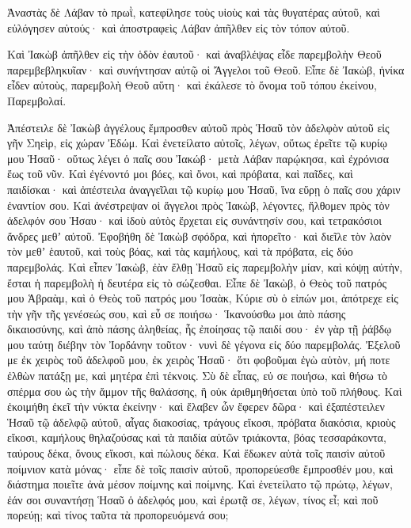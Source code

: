 {Ἀναστὰς δὲ Λάβαν τὸ πρωῒ, κατεφίλησε τοὺς υἱοὺς καὶ τὰς θυγατέρας αὐτοῦ, καὶ εὐλόγησεν αὐτούς· καὶ ἀποστραφεὶς Λάβαν ἀπῆλθεν εἰς τὸν τόπον αὐτοῦ.
\par }{\PP {}Καὶ Ἰακὼβ ἀπῆλθεν εἰς τὴν ὁδὸν ἑαυτοῦ· καὶ ἀναβλέψας εἶδε παρεμβολὴν Θεοῦ παρεμβεβληκυῖαν· καὶ συνήντησαν αὐτῷ οἱ Ἄγγελοι τοῦ Θεοῦ.
Εἶπε δὲ Ἰακὼβ, ἡνίκα εἶδεν αὐτοὺς, παρεμβολὴ Θεοῦ αὕτη· καὶ ἐκάλεσε τὸ ὄνομα τοῦ τόπου ἐκείνου, Παρεμβολαί.
\par }{\PP {}Ἀπέστειλε δὲ Ἰακὼβ ἀγγέλους ἔμπροσθεν αὐτοῦ πρὸς Ἡσαῦ τὸν ἀδελφὸν αὐτοῦ εἰς γῆν Σηεὶρ, εἰς χώραν Ἐδώμ.
Καὶ ἐνετείλατο αὐτοῖς, λέγων, οὕτως ἐρεῖτε τῷ κυρίῳ μου Ἡσαῦ· οὕτως λέγει ὁ παῖς σου Ἰακώβ· μετὰ Λάβαν παρῴκησα, καὶ ἐχρόνισα ἕως τοῦ νῦν.
Καὶ ἐγένοντό μοι βόες, καὶ ὄνοι, καὶ πρόβατα, καὶ παῖδες, καὶ παιδίσκαι· καὶ ἀπέστειλα ἀναγγεῖλαι τῷ κυρίῳ μου Ἡσαῦ, ἵνα εὕρῃ ὁ παῖς σου χάριν ἐναντίον σου.
Καὶ ἀνέστρεψαν οἱ ἄγγελοι πρὸς Ἰακὼβ, λέγοντες, ἤλθομεν πρὸς τὸν ἀδελφόν σου Ἡσαυ· καὶ ἰδοὺ αὐτὸς ἔρχεται εἰς συνάντησίν σου, καὶ τετρακόσιοι ἄνδρες μεθʼ αὐτοῦ.
Ἐφοβήθη δὲ Ἰακὼβ σφόδρα, καὶ ἠπορεῖτο· καὶ διεῖλε τὸν λαὸν τὸν μεθʼ ἑαυτοῦ, καὶ τοὺς βόας, καὶ τὰς καμήλους, καὶ τὰ πρόβατα, εἰς δύο παρεμβολάς.
Καὶ εἶπεν Ἰακὼβ, ἐὰν ἔλθῃ Ἡσαῦ εἰς παρεμβολὴν μίαν, καὶ κόψῃ αὐτὴν, ἔσται ἡ παρεμβολὴ ἡ δευτέρα εἰς τὸ σώζεσθαι.
Εἶπε δὲ Ἰακὼβ, ὁ Θεὸς τοῦ πατρός μου Ἁβραὰμ, καὶ ὁ Θεὸς τοῦ πατρός μου Ἰσαὰκ, Κύριε σὺ ὁ εἰπών μοι, ἀπότρεχε εἰς τὴν γῆν τῆς γενέσεώς σου, καὶ εὖ σε ποιήσω·
Ἱκανούσθω μοι ἀπὸ πάσης δικαιοσύνης, καὶ ἀπὸ πάσης ἀληθείας, ἧς ἐποίησας τῷ παιδί σου· ἐν γὰρ τῇ ῥάβδῳ μου ταύτῃ διέβην τὸν Ἰορδάνην τοῦτον· νυνὶ δὲ γέγονα εἰς δύο παρεμβολάς.
Ἐξελοῦ με ἐκ χειρὸς τοῦ ἀδελφοῦ μου, ἐκ χειρὸς Ἡσαῦ· ὅτι φοβοῦμαι ἐγὼ αὐτὸν, μή ποτε ἐλθὼν πατάξῃ με, καὶ μητέρα ἐπὶ τέκνοις.
Σὺ δὲ εἶπας, εὐ σε ποιήσω, καὶ θήσω τὸ σπέρμα σου ὡς τὴν ἄμμον τῆς θαλάσσης, ἣ οὐκ ἀριθμηθήσεται ὑπὸ τοῦ πλήθους.
Καὶ ἐκοιμήθη ἐκεῖ τὴν νύκτα ἐκείνην· καὶ ἔλαβεν ὧν ἔφερεν δῶρα· καὶ ἐξαπέστειλεν Ἡσαῦ τῷ ἀδελφῷ αὐτοῦ,
αἶγας διακοσίας, τράγους εἴκοσι, πρόβατα διακόσια, κριοὺς εἴκοσι,
καμήλους θηλαζούσας καὶ τὰ παιδία αὐτῶν τριάκοντα, βόας τεσσαράκοντα, ταύρους δέκα, ὄνους εἴκοσι, καὶ πώλους δέκα.
Καὶ ἔδωκεν αὐτὰ τοῖς παισὶν αὐτοῦ ποίμνιον κατὰ μόνας· εἶπε δὲ τοῖς παισὶν αὐτοῦ, προπορεύεσθε ἔμπροσθέν μου, καὶ διάστημα ποιεῖτε ἀνὰ μέσον ποίμνης καὶ ποίμνης.
Καὶ ἐνετείλατο τῷ πρώτῳ, λέγων, ἐάν σοι συναντήσῃ Ἡσαῦ ὁ ἀδελφός μου, καὶ ἐρωτᾷ σε, λέγων, τίνος εἶ; καὶ ποῦ πορεύῃ; καὶ τίνος ταῦτα τὰ προπορευόμενά σου;
}
